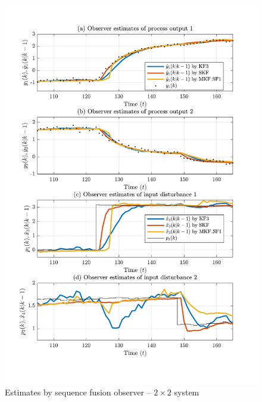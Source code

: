 \begin{figure}[htp]
	\centering
	\includegraphics[width=13cm]{images/rod_obs_sim2_all_seed_y_est2_SF1.pdf}
	\caption{Estimates by sequence fusion observer –  $2\times2$ system}
	\label{fig:rod-obs-sim2-yest-2-SP}
\end{figure}

